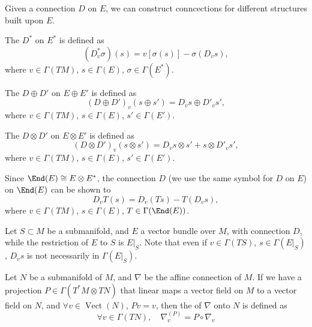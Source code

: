 \documentclass[openany, oneside, a5paper]{book}
\DeclareMathOperator{\Vect}{Vect}
\begin{document}
Given a connection $D$ on $E$, we can construct conncections for different structures built upon $E$.

The  $D^*$ on $E^*$ is defined as
\begin{equation}
    (D^*_v \sigma) (s) = v[\sigma(s)] - \sigma (D_v s),
\end{equation}
where $v \in \Gamma(TM)$, $s \in \Gamma(E)$, $\sigma \in \Gamma(E^*)$.

The  $D \oplus D'$ on $E \oplus E'$ is defined as
\begin{equation}
    (D \oplus D')_v (s \oplus s') = D_v s \oplus D'_v s',
\end{equation}
where $v \in \Gamma(TM)$, $s \in \Gamma(E)$, $s' \in \Gamma(E')$.

The  $D \otimes D'$ on $E \otimes E'$ is defined as
\begin{equation}
    (D \otimes D')_v (s \otimes s') = D_v s \otimes s' + s \otimes D'_v s',
\end{equation}
where $v \in \Gamma(TM)$, $s \in \Gamma(E)$, $s' \in \Gamma(E')$.

Since $\End(E) \cong E \otimes E^*$, the connection $D$ (we use the same symbol for $D$ on $E$) on $\End(E)$ can be shown to 
\begin{equation}
    D_v T (s) = D_v(Ts) - T(D_v s),
\end{equation}
where $v \in \Gamma(TM)$, $s \in \Gamma(E)$, $T \in \Gamma(\End(E))$.

Let $S \subset M$ be a submanifold, 
and $E$ a vector bundle over $M$, 
with connection $D$, while the restriction of $E$ to $S$ is $E|_S$.
Note that even if $v \in \Gamma(TS)$, $s \in \Gamma(E|_S)$, 
$D_v s $ is not necessarily in $\Gamma(E|_S)$.

\begin{definition}
    Let $N$ be a submanifold of $M$, and $\nabla$ be the affine connection of $M$.
    If we have a projection $P \in \Gamma(T^*M \otimes TN)$ that linear maps a vector field on $M$ to a vector field on $N$, and $\forall v \in \Vect(N)$, $Pv = v$,
    then the  of $\nabla$ onto $N$ is defined as
    \begin{equation}
        \forall v \in \Gamma(TN), \quad
        \nabla^{(P)}_v = P \circ \nabla_v
    \end{equation}
\end{definition}
\end{document}
